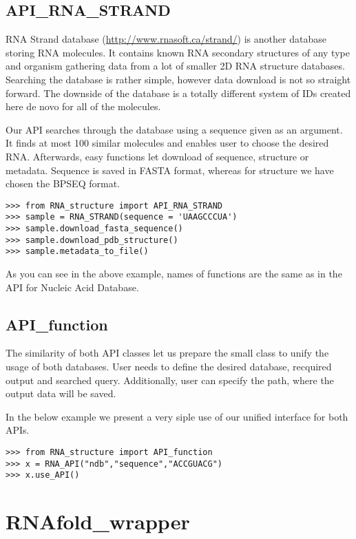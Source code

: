 \subsection{API_RNA_STRAND}

RNA Strand database (\url{http://www.rnasoft.ca/strand/}) is another
database storing RNA molecules. It contains known RNA secondary structures
of any type and organism gathering data from a lot of smaller 2D RNA structure
databases. Searching the database is rather simple, however data download
is not so straight forward. The downside of the database is a totally different
system of IDs created here de novo for all of the molecules.

Our API searches through the database using a sequence given as an argument.
It finds at most 100 similar molecules and enables user to choose the desired
RNA. Afterwards, easy functions let download of sequence, structure or metadata.
Sequence is saved in FASTA format, whereas for structure we have chosen
the BPSEQ format.

\begin{verbatim}
>>> from RNA_structure import API_RNA_STRAND
>>> sample = RNA_STRAND(sequence = 'UAAGCCCUA')
>>> sample.download_fasta_sequence()
>>> sample.download_pdb_structure()
>>> sample.metadata_to_file()
\end{verbatim}

As you can see in the above example, names of functions are the same as in the
API for Nucleic Acid Database.

\subsection{API_function}

The similarity of both API classes let us prepare the small class to unify
the usage of both databases. User needs to define the desired database,
recquired output and searched query. Additionally, user can specify the path,
where the output data will be saved.

In the below example we present a very siple use of our unified interface for both APIs.

\begin{verbatim}
>>> from RNA_structure import API_function
>>> x = RNA_API("ndb","sequence","ACCGUACG")
>>> x.use_API()
\end{verbatim}

\section{RNAfold_wrapper}


